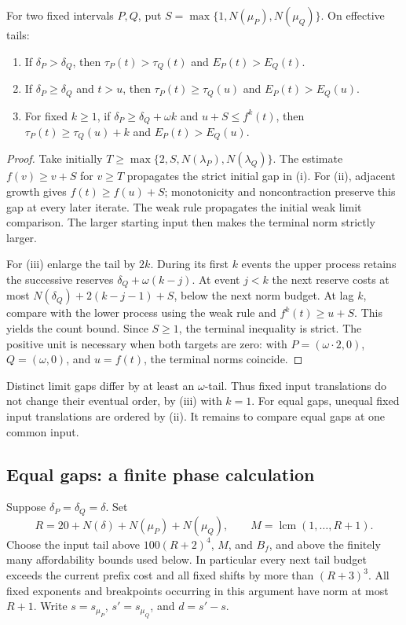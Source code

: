 \begin{lemma}\label{lem:gap-input}
For two fixed intervals \(P,Q\), put
\(S=\max\{1,N(\mu_P),N(\mu_Q)\}\). On effective tails:
\begin{enumerate}[label=(\roman*)]
\item If \(\delta_P>\delta_Q\), then
\(\tau_P(t)>\tau_Q(t)\) and \(E_P(t)>E_Q(t)\).
\item If \(\delta_P\ge\delta_Q\) and \(t>u\), then
\(\tau_P(t)\ge\tau_Q(u)\) and \(E_P(t)>E_Q(u)\).
\item For fixed \(k\ge1\), if
\(\delta_P\ge\delta_Q+\omega k\) and \(u+S\le f^k(t)\), then
\(\tau_P(t)\ge\tau_Q(u)+k\) and \(E_P(t)>E_Q(u)\).
\end{enumerate}
\end{lemma}
\begin{proof}
Take initially
\(T\ge\max\{2,S,N(\lambda_P),N(\lambda_Q)\}\).
The estimate \(f(v)\ge v+S\) for \(v\ge T\) propagates the strict
initial gap in (i). For (ii), adjacent growth gives
\(f(t)\ge f(u)+S\); monotonicity and noncontraction preserve this
gap at every later iterate. The weak rule propagates the initial weak
limit comparison. The larger starting input then makes the terminal
norm strictly larger.

For (iii) enlarge the tail by \(2k\). During its first \(k\) events
the upper process retains the successive reserves
\(\delta_Q+\omega(k-j)\). At event \(j<k\) the next reserve costs
at most \(N(\delta_Q)+2(k-j-1)+S\), below the next norm budget.
At lag \(k\), compare with the lower process using the weak rule and
\(f^k(t)\ge u+S\). This yields the count bound. Since \(S\ge1\),
the terminal inequality is strict. The positive unit is necessary when
both targets are zero: with \(P=(\omega\cdot2,0)\), \(Q=(\omega,0)\),
and \(u=f(t)\), the terminal norms coincide.
\end{proof}

Distinct limit gaps differ by at least an \(\omega\)-tail. Thus fixed
input translations do not change their eventual order, by (iii) with
\(k=1\). For equal gaps, unequal fixed input translations are ordered
by (ii). It remains to compare equal gaps at one common input.

\subsection{Equal gaps: a finite phase calculation}

Suppose \(\delta_P=\delta_Q=\delta\). Set
\[
 R=20+N(\delta)+N(\mu_P)+N(\mu_Q),\qquad
 M=\operatorname{lcm}(1,\ldots,R+1).
\]
Choose the input tail above \(100(R+2)^4\), \(M\), and \(B_f\),
and above the finitely many affordability bounds used below. In
particular every next tail budget exceeds the current prefix cost and
all fixed shifts by more than \((R+3)^3\).
All fixed exponents and breakpoints occurring in this argument have
norm at most \(R+1\). Write \(s=s_{\mu_P}\), \(s'=s_{\mu_Q}\),
and \(d=s'-s\).

